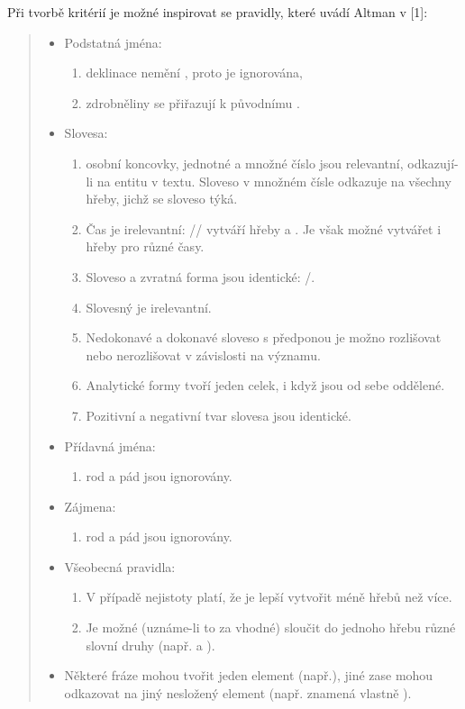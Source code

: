 \documentclass[dp.tex]{subfiles}
\begin{document}
Při tvorbě kritérií je možné inspirovat se pravidly, které uvádí Altman v [1]:
\begin{quote}
\begin{itemize}
\item Podstatná jména:
\begin{enumerate}
\item deklinace nemění  , proto je ignorována,
\item zdrobněliny se přiřazují k původnímu .
\end{enumerate}
\item Slovesa:
\begin{enumerate}
\item osobní koncovky, jednotné a množné číslo jsou relevantní, odkazují-li na entitu v textu. Sloveso v množném čísle odkazuje na všechny hřeby, jichž se sloveso týká.
\item Čas je irelevantní: // vytváří hřeby  a . Je však možné vytvářet i hřeby pro různé časy.
\item Sloveso a zvratná forma jsou identické: /.
\item Slovesný  je irelevantní.
\item Nedokonavé a dokonavé sloveso s předponou je možno rozlišovat nebo nerozlišovat v závislosti na významu.
\item Analytické formy tvoří jeden celek, i když jsou od sebe oddělené.
\item Pozitivní a negativní tvar slovesa jsou identické.
\end{enumerate}
\item Přídavná jména:
\begin{enumerate}
\item rod a pád jsou ignorovány.
\end{enumerate}
\item Zájmena:
\begin{enumerate}
\item rod a pád jsou ignorovány.
\end{enumerate}
\item Všeobecná pravidla:
\begin{enumerate}
\item V případě nejistoty platí, že je lepší vytvořit méně hřebů než více.
\item Je možné (uznáme-li to za vhodné) sloučit do jednoho hřebu různé slovní druhy (např.  a ).
\end{enumerate}
\item Některé fráze mohou tvořit jeden element (např.), jiné zase mohou odkazovat na jiný nesložený element (např.  znamená vlastně ).
\end{itemize}
\end{quote}
\end{document}

